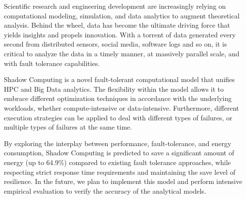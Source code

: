 Scientific research and engineering development are increasingly relying on computational modeling, simulation, and data analytics to augment theoretical analysis. Behind the wheel, data has become the ultimate driving force that yields insights and propels innovation. With a torrent of data generated every second from distributed sensors, social media, software logs and so on, it is critical to analyze the data in a timely manner,  at massively parallel scale, and with fault tolerance capabilities. 

Shadow Computing is a novel fault-tolerant computational model that unifies HPC and Big Data analytics. The flexibility within the model allows it to embrace different optimization techniques in accordance with the underlying workloads, whether compute-intensive or data-intensive. Furthermore, different execution strategies can be applied to deal with different types of failures, or multiple types of failures at the same time. 

By exploring the interplay between performance, fault-tolerance, and energy consumption, Shadow Computing is predicted to save a significant amount of energy (up to 64.9\%) compared to existing fault tolerance approaches, while respecting strict response time requirements and maintaining the save level of resilience. In the future, we plan to implement this model and perform intensive empirical evaluation to verify the accuracy of the analytical models.     